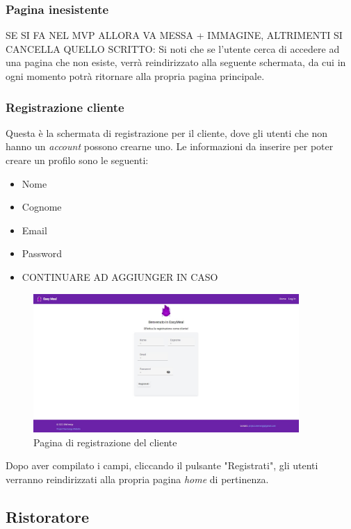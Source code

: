 \subsubsection{Pagina inesistente}
SE SI FA NEL MVP ALLORA VA MESSA + IMMAGINE, ALTRIMENTI SI CANCELLA QUELLO SCRITTO:
Si noti che se l'utente cerca di accedere ad una pagina che non esiste, verrà reindirizzato alla
seguente schermata, da cui in ogni momento potrà ritornare alla propria pagina principale.


\subsubsection{Registrazione cliente}
Questa è la schermata di registrazione per il cliente, dove gli utenti che non hanno un \textit{account} possono crearne uno.
Le informazioni da inserire per poter creare un profilo sono le seguenti:
\begin{itemize}
    \item Nome
    \item Cognome
    \item Email
    \item Password
    \item CONTINUARE AD AGGIUNGER IN CASO
\end{itemize}

\newpage
\begin{figure}[h]
    \centering
    \includegraphics[width=0.9\textwidth]{./img/registrazioneCliente.jpg}
    \caption{Pagina di registrazione del cliente}
    \label{fig:esempio}
\end{figure}

Dopo aver compilato i campi, cliccando il pulsante "Registrati", gli utenti verranno reindirizzati alla propria pagina \textit{home} di pertinenza.



\subsection{Ristoratore} %

